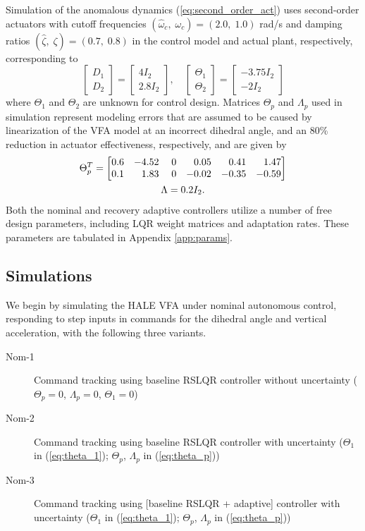 Simulation of the anomalous dynamics (\ref{eq:second_order_act}) uses second-order actuators with cutoff frequencies $(\hat{\omega}_c,\; \omega_c) = (2.0 ,\; 1.0)$ rad/s and damping ratios $(\hat{\zeta},\; \zeta) = (0.7,\; 0.8)$ in the control model and actual plant, respectively, corresponding to
\begin{equation}
\begin{bmatrix}
	D_1 \\ D_2
\end{bmatrix} = \begin{bmatrix}
	4 I_2 \\ 2.8 I_2
\end{bmatrix}, \quad \begin{bmatrix}
	\Theta_1 \\ \Theta_2 
\end{bmatrix} = \begin{bmatrix}
	-3.75 I_2 \\ -2 I_2
\end{bmatrix}
\end{equation}
where $\Theta_1$ and $\Theta_2$ are unknown for control design. Matrices $\Theta_p$ and $\Lambda_p$ used in simulation represent modeling errors that are assumed to be caused by linearization of the VFA model at an incorrect dihedral angle, and an 80\% reduction in actuator effectiveness, respectively, and are given by
\begin{equation}
\begin{gathered}
\Theta_{p}^{T}=\begin{bmatrix}
0.6 & -4.52 & \; 0 & \hfill 0.05 & \hfill 0.41 & \hfill 1.47\\
0.1 & \hfill 1.83 & \; 0 & -0.02 & -0.35 & -0.59
\end{bmatrix}\\ \Lambda = 0.2 I_2. \end{gathered} \label{eq:theta_p}
\end{equation}
Both the nominal and recovery adaptive controllers utilize a number of free design parameters, including LQR weight matrices and adaptation rates. These parameters are tabulated in Appendix \ref{app:params}.


\subsection{Simulations} \label{subsec:sims}
We begin by simulating the HALE VFA under nominal autonomous control, responding to step inputs in commands for the dihedral angle and vertical acceleration, with the following three variants.
\begin{description}
	\item[Nom-1] Command tracking using baseline RSLQR controller without uncertainty ($\Theta_p = 0$, $\Lambda_p = 0$, $\Theta_1 = 0$)
	\item[Nom-2] Command tracking using baseline RSLQR controller with uncertainty ($\Theta_1$ in (\ref{eq:theta_1}); $\Theta_p$, $\Lambda_p$ in (\ref{eq:theta_p}))
	\item[Nom-3] Command tracking using [baseline RSLQR + adaptive] controller with uncertainty ($\Theta_1$ in (\ref{eq:theta_1}); $\Theta_p$, $\Lambda_p$ in (\ref{eq:theta_p}))
\end{description}

